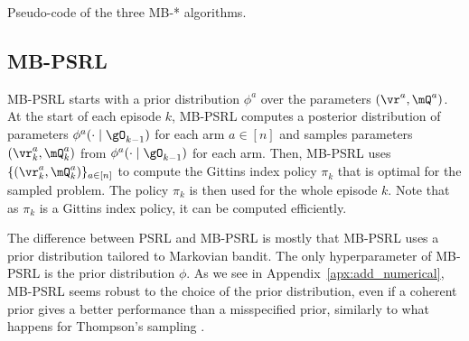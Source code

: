 \begin{algorithm}[ht]
    \BlankLine
    \caption{Pseudo-code of the three MB-* algorithms.}
    \label{fig:algos}
\end{algorithm}

\subsection{MB-PSRL}
MB-PSRL starts with a prior distribution \(\phi^{a}\) over the parameters \((\vr^a,\mQ^a)\). At the start of each episode $k$, MB-PSRL computes
a posterior distribution of parameters \(\phi^a(\cdot \mid\gO_{k-1})\) for
each arm $a\in[n]$ and samples parameters \((\vr_k^a,\mQ_k^a)\) from
\(\phi^a(\cdot \mid\gO_{k-1})\) for each arm. Then, MB-PSRL uses \(\{(\vr_k^a,\mQ_k^a)\}_{a\in[n]}\)
to compute the Gittins index policy $\pi_k$ that is optimal for the sampled
problem.  The policy \(\pi_k\)  is then used for the whole episode \(k\). Note that as $\pi_k$ is a Gittins index policy, it can be computed efficiently. 

The difference between PSRL and MB-PSRL is mostly that MB-PSRL uses a prior distribution tailored to Markovian bandit.  The only hyperparameter of MB-PSRL is the prior distribution $\phi$. As we see in Appendix~\ref{apx:add_numerical},
MB-PSRL seems robust to the choice of the prior distribution, even if a
coherent prior gives a better performance than a misspecified prior, similarly
to what happens for Thompson's sampling \cite{russo2018tutorial}. 

